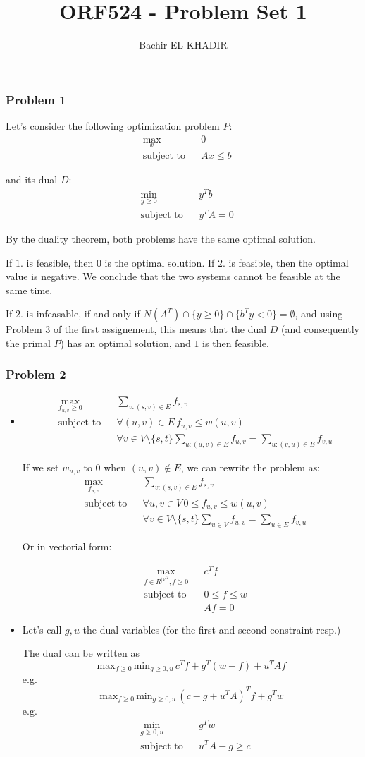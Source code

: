 \documentclass[12pt]{article}
\title{ORF524 - Problem Set 1}
\author{Bachir EL KHADIR }
\newcommand{\Q}[1]{\subsubsection*{Problem #1}}
\newcommand{\optimize}[4]{\begin{equation}
\begin{aligned}
& \underset{#1}{\text{#4}}
& & #2 \\
& \text{subject to}
& & #3
\end{aligned}
\end{equation}
}
\newcommand{\inter}[1]{\underset{#1}{\cap} }
\newcommand{\minimize}[3]{\optimize{#1}{#2}{#3}{min}}
\newcommand{\maximize}[3]{\optimize{#1}{#2}{#3}{max}}
\begin{document}
\maketitle

\Q{1}

Let's consider the following optimization problem $P$:
\maximize{x}{0}{Ax \leq b}
and its dual $D$:
\minimize{y \geq 0}{y^T b}{y^TA = 0}
By the duality theorem, both problems have the same optimal solution.

If $1.$ is feasible, then $0$ is the optimal solution. If $2.$ is feasible, then the optimal value is negative. We conclude that the two systems cannot be feasible at the same time.

If $2.$ is infeasable, if and only if $N(A^T) \inter{} \{y \geq 0\} \inter{} \{b^Ty < 0 \} = \emptyset$, and using Problem $3$ of the first assignement, this means that the dual $D$ (and consequently the primal $P$) has an optimal solution, and $1$ is then feasible.

\Q{2}
\begin{itemize}

\item
\maximize{f_{u,v} \geq 0}{ \sum_{v: (s,v) \in E} f_{s,v}}
{  \forall (u,v) \in E \, f_{u,v} \leq w(u, v) \\ &&& \forall v \in V \setminus \{s,t\} \sum_{u: (u,v) \in E} f_{u,v} = \sum_{u: (v, u) \in E} f_{v,u}}

If we set $w_{u,v}$ to 0 when $(u,v) \not \in E$, we can rewrite the problem as:
\maximize{f_{u,v} }{ \sum_{v: (s,v) \in E} f_{s,v}}
{  \forall u,v \in V \, 0 \leq f_{u,v} \leq w(u, v) \\ &&& \forall v \in V \setminus \{s,t\} \sum_{u \in V} f_{u,v} = \sum_{u \in E} f_{v,u}}


Or in vectorial form:

\maximize{f \in R^{|V|^2}, f \geq 0 }{ c^T f}
{  0 \leq f \leq w \\ &&& Af = 0}

\item Let's call $g, u$ the dual variables (for the first and second constraint resp.)

The dual can be written as
$$\text{max}_{f \geq 0 } \, { \text{min}_{g \geq 0, u} \, c^T f + g^T(w-f) + u^TAf}$$
e.g.
$$\text{max}_{f \geq 0 } \, { \text{min}_{g \geq 0, u} \, (c-g+u^TA)^T f + g^Tw }$$
e.g.
\minimize{g \geq 0, u}{g^Tw }{u^TA - g \geq c}

\end{itemize}
\end{document}
